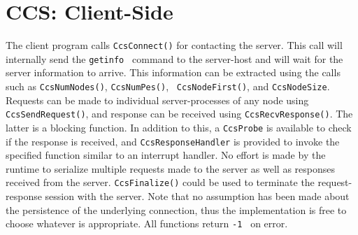 
\section{CCS: Client-Side}

The client program calls {\tt  CcsConnect()} for contacting the server. This
call will internally send the {\tt getinfo } command to the server-host and
will wait for the server information to arrive. This information can be
extracted using the calls such as {\tt  CcsNumNodes()}, {\tt CcsNumPes()}, {\tt
CcsNodeFirst()}, and {\tt CcsNodeSize}. Requests can be made to individual
server-processes of any node using {\tt CcsSendRequest()}, and response can be
received using {\tt CcsRecvResponse()}. The latter is a blocking function. In
addition to this, a {\tt CcsProbe} is available to check if the response is
received, and {\tt CcsResponseHandler} is provided to invoke the specified
function similar to an interrupt handler. No effort is made by the runtime to
serialize multiple requests made to the server as well as responses received
from the server. {\tt CcsFinalize()} could be used to terminate the
request-response session with the server. Note that no assumption has been made
about the persistence of the underlying connection, thus the implementation is
free to choose whatever is appropriate. All functions return {\tt  -1 } on
error.












